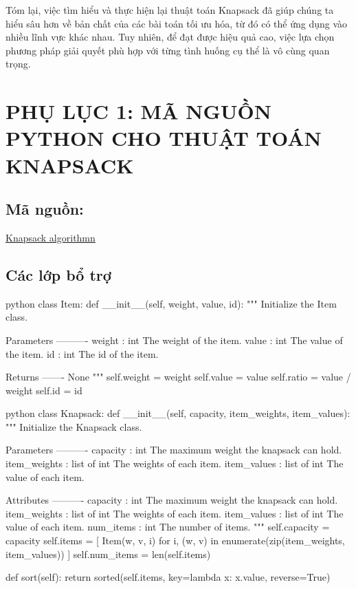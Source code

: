 Tóm lại, việc tìm hiểu và thực hiện lại thuật toán Knapsack đã giúp chúng ta hiểu sâu hơn về bản chất của các bài toán tối ưu hóa, từ đó có thể ứng dụng vào nhiều lĩnh vực khác nhau. Tuy nhiên, để đạt được hiệu quả cao, việc lựa chọn phương pháp giải quyết phù hợp với từng tình huống cụ thể là vô cùng quan trọng.


\appendix 

\chapter*{PHỤ LỤC 1: MÃ NGUỒN PYTHON CHO THUẬT TOÁN KNAPSACK}

\section{Mã nguồn:}\href{https://drive.google.com/drive/folders/1vWSQapUZHMn098ktCKMt2karA2bhzFtI?usp=sharing}{Knapsack algorithmn}

\section{Các lớp bổ trợ}

\begin{mintedbox}{python}
class Item:
    def __init__(self, weight, value, id):
        """
        Initialize the Item class.

        Parameters
        ----------
        weight : int
            The weight of the item.
        value : int
            The value of the item.
        id : int
            The id of the item.

        Returns
        -------
        None
        """
        self.weight = weight
        self.value = value
        self.ratio = value / weight
        self.id = id
\end{mintedbox}


\begin{mintedbox}{python}
    class Knapsack:
    def __init__(self, capacity, item_weights, item_values):
        """
        Initialize the Knapsack class.

        Parameters
        ----------
        capacity : int
            The maximum weight the knapsack can hold.
        item_weights : list of int
            The weights of each item.
        item_values : list of int
            The value of each item.

        Attributes
        ----------
        capacity : int
            The maximum weight the knapsack can hold.
        item_weights : list of int
            The weights of each item.
        item_values : list of int
            The value of each item.
        num_items : int
            The number of items.
        """
        self.capacity = capacity
        self.items = [
            Item(w, v, i) for i, (w, v) in enumerate(zip(item_weights, item_values))
        ]
        self.num_items = len(self.items)

    def sort(self):
        return sorted(self.items, key=lambda x: x.value, reverse=True)
\end{mintedbox}

